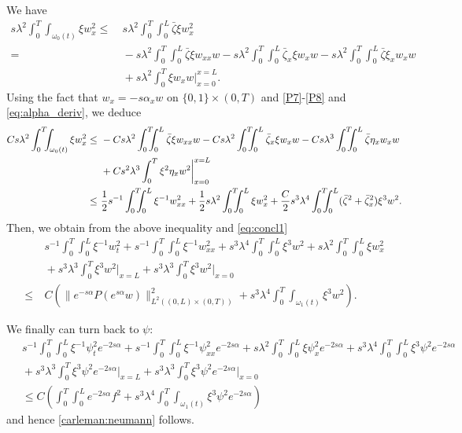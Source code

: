 \documentclass[10pt]{article}
\def\om{\omega}
\def\\Phivec{\mathbf{\Phi}}
\newcommand{\ii}{\iiTL }
\newcommand{\iiTL}{\int_0^T\!\!\!\!\int_0^L }
\begin{document}
\begin{appendix}
	We have
\[
\begin{alignedat}{2}
	s\lambda^2\int_0^T\!\!\!\int_{\om_0(t)}\xi w_x^2
	\leq&~ s\lambda^2\ii \bar\zeta\xi w_x^2 \\
	=&~ - s\lambda^2\ii \bar\zeta\xi w_{xx}w- s\lambda^2\ii \bar\zeta_x\xi w_{x}w- s\lambda^2\ii \bar\zeta\xi_x w_{x}w\\
	&~+s\lambda^2\int_0^T\xi w_xw\bigg|^{x=L}_{x=0}.
\end{alignedat}
\]	
	Using the fact that $w_x=-s \alpha_x w $ on $\{0,1\}\times(0,T)$ and \eqref{P7}-\eqref{P8} and \eqref{eq:alpha_deriv}, we deduce
\[
\begin{alignedat}{2}
	Cs\lambda^2\int_0^T\!\!\!\int_{\om_0(t)}\xi w_x^2
	\leq&~ - Cs\lambda^2\ii \bar\zeta\xi w_{xx}w- Cs\lambda^2\ii \bar\zeta_x\xi w_{x}w- Cs\lambda^3\ii \bar\zeta\eta_x w_{x}w\\
	&~+Cs^2\lambda^3\int_0^T\xi^2 \eta_xw^2\bigg|^{x=L}_{x=0}\\
	\leq&~ {1\over2} s^{-1}\ii\xi^{-1} w_{xx}^2+{1\over2} s\lambda^2\ii\xi w_{x}^2
	+{C\over2} s^3\lambda^4\ii (\bar\zeta^2+\bar\zeta_x^2) \xi^3w^2.
\end{alignedat}
\]	
	Then, we obtain from the above inequality and \eqref{eq:concl1}
\begin{equation}\label{eq:concl2}
\begin{alignedat}{2}
	&~s^{-1}\ii\xi^{-1} w^2_{t}+s^{-1}\ii\xi^{-1} w^2_{xx}+s^3\lambda^4\ii\xi^3 w^2+s\lambda^2\ii \xi w_x^2\\
	&~+s^3\lambda^3\int_0^T\xi^3 w^2\big|_{x=L}+s^3\lambda^3\int_0^T\xi^3 w^2\big|_{x=0}\\
	\leq&~ C\left(\|e^{-s\alpha} P(e^{s\alpha} w )\|^2_{L^2((0,L)\times(0,T))} +s^3\lambda^4\int_0^T\!\!\!\int_{\om_1(t)}\xi^3 w^2\right).
\end{alignedat}
\end{equation}

	We finally can turn back to $\psi$:
\begin{equation}\label{eq:concl2}
\begin{alignedat}{2}
	&~s^{-1}\ii\!\!\!\!\xi^{-1} \psi^2_{t}e^{-2s\alpha}+s^{-1}\ii\!\!\!\!\xi^{-1} \psi^2_{xx}e^{-2s\alpha}+s\lambda^2\ii \!\!\!\!\xi \psi_x^2e^{-2s\alpha}+s^3\lambda^4\ii\!\!\!\!\xi^3 \psi^2e^{-2s\alpha}\\
	&~+s^3\lambda^3\int_0^T\xi^3 \psi^2e^{-2s\alpha}\big|_{x=L}+s^3\lambda^3\int_0^T\xi^3 \psi^2e^{-2s\alpha}\big|_{x=0}\\
	&~\leq C\left(\ii e^{-2s\alpha} f^2+s^3\lambda^4\int_0^T\!\!\!\int_{\om_1(t)}\xi^3 \psi^2e^{-2s\alpha}\right)
\end{alignedat}
\end{equation}
	and hence \eqref{carleman:neumann} follows.
\end{appendix}
\end{document}
